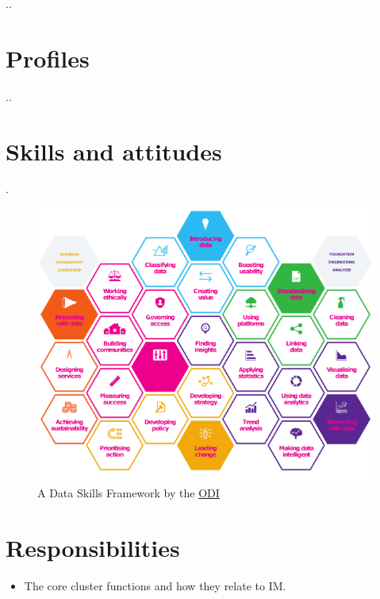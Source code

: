 \documentclass[
  a4paper,
  onecolumn,
  oneside]{book}
\providecommand{\tightlist}{%
  \setlength{\itemsep}{0pt}\setlength{\parskip}{0pt}}\usepackage{longtable,booktabs,array}
\begin{document}
..

\hypertarget{profiles}{%
\section{Profiles}\label{profiles}}

..

\hypertarget{skills-and-attitudes}{%
\section{Skills and attitudes}\label{skills-and-attitudes}}

.

\begin{figure}

{\centering \includegraphics{part1/./images/dataskillsframework.png}

}

\caption{A Data Skills Framework by the
\href{https://theodi.org/article/data-skills-framework/}{ODI}}

\end{figure}

\hypertarget{responsibilities}{%
\section{Responsibilities}\label{responsibilities}}

\begin{itemize}
\tightlist
\item
  The core cluster functions and how they relate to IM.
\end{itemize}
\end{document}
